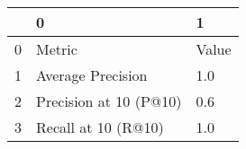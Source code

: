 \begin{tabular}{lll}
\toprule
{} &                       0 &      1 \\
\midrule
0 &                  Metric &  Value \\
1 &       Average Precision &    1.0 \\
2 &  Precision at 10 (P@10) &    0.6 \\
3 &     Recall at 10 (R@10) &    1.0 \\
\bottomrule
\end{tabular}

